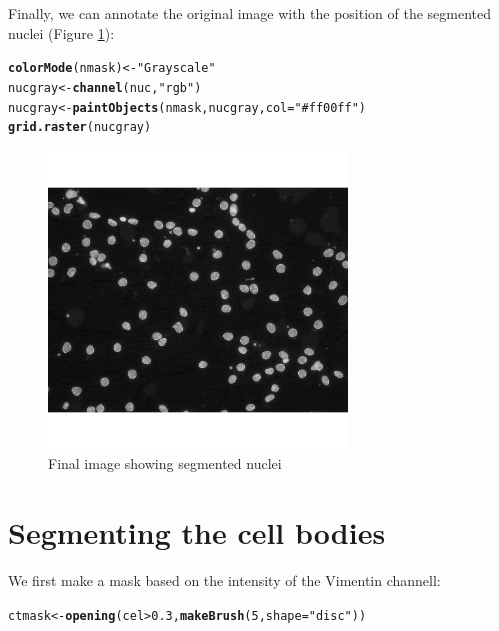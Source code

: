 \documentclass{article}\usepackage[]{graphicx}\usepackage[]{color}
\makeatletter
\newcommand{\hlnum}[1]{\textcolor[rgb]{0.686,0.059,0.569}{#1}}%
\newcommand{\hlstr}[1]{\textcolor[rgb]{0.192,0.494,0.8}{#1}}%
\newcommand{\hlopt}[1]{\textcolor[rgb]{0,0,0}{#1}}%
\newcommand{\hlstd}[1]{\textcolor[rgb]{0.345,0.345,0.345}{#1}}%
\newcommand{\hlkwb}[1]{\textcolor[rgb]{0.69,0.353,0.396}{#1}}%
\newcommand{\hlkwc}[1]{\textcolor[rgb]{0.333,0.667,0.333}{#1}}%
\newcommand{\hlkwd}[1]{\textcolor[rgb]{0.737,0.353,0.396}{\textbf{#1}}}%
\newenvironment{kframe}{%
 \def\at@end@of@kframe{}%
 \ifinner\ifhmode%
  \def\at@end@of@kframe{\end{minipage}}%
  \begin{minipage}{\columnwidth}%
 \fi\fi%
 \def\FrameCommand##1{\hskip\@totalleftmargin \hskip-\fboxsep
 \colorbox{shadecolor}{##1}\hskip-\fboxsep
     \hskip-\linewidth \hskip-\@totalleftmargin \hskip\columnwidth}%
 \MakeFramed {\advance\hsize-\width
   \@totalleftmargin\z@ \linewidth\hsize
   \@setminipage}}%
 {\par\unskip\endMakeFramed%
 \at@end@of@kframe}
\newenvironment{knitrout}{}{} %
\makeatother
\begin{document}
Finally, we can annotate the original image with the position of the segmented nuclei (Figure \ref{fig:nucgray}):
\begin{knitrout}
\color{fgcolor}\begin{kframe}
\begin{alltt}
\hlkwd{colorMode}\hlstd{(nmask)} \hlkwb{<-} \hlstr{"Grayscale"}
\hlstd{nucgray} \hlkwb{<-} \hlkwd{channel}\hlstd{(nuc,} \hlstr{"rgb"}\hlstd{)}
\hlstd{nucgray} \hlkwb{<-} \hlkwd{paintObjects}\hlstd{(nmask, nucgray,} \hlkwc{col} \hlstd{=} \hlstr{"#ff00ff"}\hlstd{)}
\hlkwd{grid.raster}\hlstd{(nucgray)}
\end{alltt}
\end{kframe}\begin{figure}[]


{\centering \includegraphics[width=300px]{knit_figure/fignucgray} 

}

\caption[Final image showing segmented nuclei]{Final image showing segmented nuclei\label{fig:nucgray}}
\end{figure}


\end{knitrout}


\section{Segmenting the cell bodies}
We first make a mask based on the intensity of the Vimentin channell:
\begin{knitrout}
\color{fgcolor}\begin{kframe}
\begin{alltt}
\hlstd{ctmask} \hlkwb{<-} \hlkwd{opening}\hlstd{(cel} \hlopt{>} \hlnum{0.3}\hlstd{,} \hlkwd{makeBrush}\hlstd{(}\hlnum{5}\hlstd{,} \hlkwc{shape} \hlstd{=} \hlstr{"disc"}\hlstd{))}
\end{alltt}
\end{kframe}
\end{knitrout}
\end{document}

